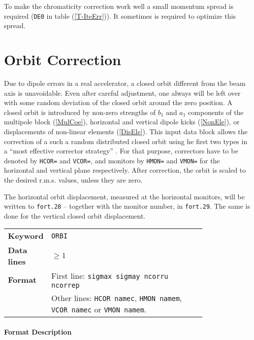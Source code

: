 To make the chromaticity correction work well a small momentum spread is required (\texttt{DE0} in table (\ref{T-IteErr})).
It sometimes is required to optimize this spread.

\section{Orbit Correction} \label{OrbCorr}

Due to dipole errors in a real accelerator, a closed orbit different from the beam axis is unavoidable.
Even after careful adjustment, one always will be left over with some random deviation of the closed orbit around the zero position.
A closed orbit is introduced by non-zero strengths of $b_{1}$ and $a_{1}$ components of the multipole block (\ref{MulCoe}), horizontal and vertical dipole kicks (\ref{NonEle}), or displacements of non-linear elements (\ref{DisEle}).
This input data block allows the correction of a such a random distributed closed orbit using he first two types in a ``most effective corrector strategy'' \cite{Auti}.
For that purpose, correctors have to be denoted by \texttt{HCOR=} and \texttt{VCOR=}, and monitors by \texttt{HMON=} and \texttt{VMON=} for the horizontal and vertical plane respectively.
After correction, the orbit is scaled to the desired r.m.s. values, unless they are zero.

The horizontal orbit displacement, measured at the horizontal monitors, will be written to \texttt{fort.28} -- together with the monitor number, in \texttt{fort.29}. The same is done for the vertical closed orbit displacement.

\bigskip
\begin{tabular}{@{}lp{0.8\linewidth}}
    \textbf{Keyword}    & \texttt{ORBI} \\
    \textbf{Data lines} & $\geq 1$ \\
    \textbf{Format}     & First line: \texttt{sigmax sigmay ncorru ncorrep} \\
                        & Other lines: \texttt{HCOR namec}, \texttt{HMON namem}, \texttt{VCOR namec} or \texttt{VMON namem}.\\
\end{tabular}

\paragraph{Format Description}~

